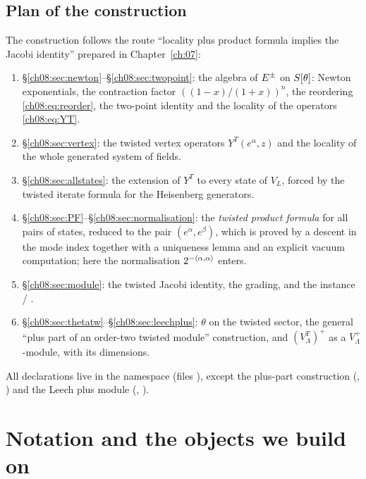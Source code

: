 \subsection{Plan of the construction}
The construction follows the route ``locality plus product formula implies the Jacobi identity''
prepared in Chapter~\ref{ch:07}:
\begin{enumerate}
\item \S\ref{ch08:sec:newton}--\S\ref{ch08:sec:twopoint}: the algebra of $E^{\pm}$ on
  $S[\theta]$: Newton exponentials, the contraction factor
  $((1-x)/(1+x))^n$, the reordering \eqref{ch08:eq:reorder}, the two-point identity and the
  locality of the operators \eqref{ch08:eq:YT}.
\item \S\ref{ch08:sec:vertex}: the twisted vertex operators $Y^T(e^\alpha,z)$ and the locality
  of the whole generated system of fields.
\item \S\ref{ch08:sec:allstates}: the extension of $Y^T$ to every state of $V_L$, forced by the
  twisted iterate formula for the Heisenberg generators.
\item \S\ref{ch08:sec:PF}--\S\ref{ch08:sec:normalisation}: the \emph{twisted product formula} for
  all pairs of states, reduced to the pair $(e^\alpha,e^\beta)$, which is proved by a
  descent in the mode index together with a uniqueness lemma and an explicit vacuum computation;
  here the normalisation $2^{-\langle \alpha,\alpha\rangle}$ enters.
\item \S\ref{ch08:sec:module}: the twisted Jacobi identity, the grading, and the instance
   / .
\item \S\ref{ch08:sec:thetatw}--\S\ref{ch08:sec:leechplus}: $\theta$ on the twisted sector, the
  general ``plus part of an order-two twisted module'' construction, and
  $(V_\Lambda^T)^+$ as a $V_\Lambda^+$-module, with its dimensions.
\end{enumerate}
All declarations live in the namespace  (files
), except the plus-part construction
(, ) and the Leech plus
module (, ).

\section{Notation and the objects we build on}\label{ch08:sec:recall}

